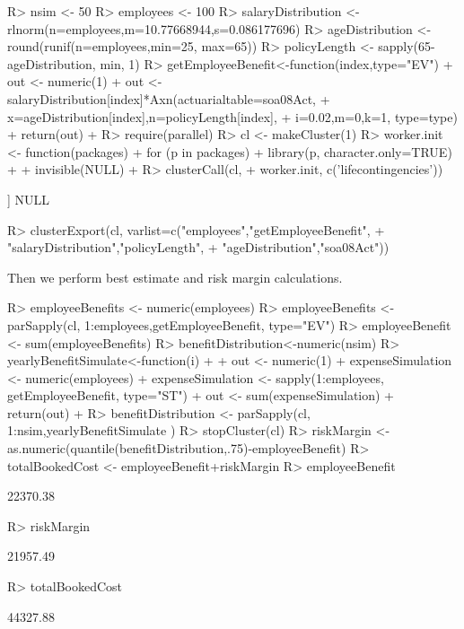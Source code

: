 \documentclass[nojss]{jss}
\begin{document}
\begin{Schunk}
\begin{Sinput}
R> nsim <- 50
R> employees <- 100
R> salaryDistribution <- rlnorm(n=employees,m=10.77668944,s=0.086177696)
R> ageDistribution <- round(runif(n=employees,min=25, max=65))
R> policyLength <- sapply(65-ageDistribution, min, 1)
R> getEmployeeBenefit<-function(index,type="EV") {
+  	out <- numeric(1)
+  	out <- salaryDistribution[index]*Axn(actuarialtable=soa08Act, 
+  			x=ageDistribution[index],n=policyLength[index], 
+  			i=0.02,m=0,k=1, type=type)
+  	return(out)
+  }
R> require(parallel)
R> cl <- makeCluster(1) 
R> worker.init <- function(packages) {
+  	for (p in packages) {
+  		library(p, character.only=TRUE)
+  	}
+  	invisible(NULL)
+  }
R> clusterCall(cl, 
+  		worker.init, c('lifecontingencies'))
\end{Sinput}
\begin{Soutput}
[[1]]
NULL
\end{Soutput}
\begin{Sinput}
R> clusterExport(cl, varlist=c("employees","getEmployeeBenefit",
+  				"salaryDistribution","policyLength",
+  				"ageDistribution","soa08Act"))
\end{Sinput}
\end{Schunk}
Then we perform best estimate and risk margin calculations.

\begin{Schunk}
\begin{Sinput}
R> employeeBenefits <- numeric(employees)
R> employeeBenefits <- parSapply(cl, 1:employees,getEmployeeBenefit, type="EV")
R> employeeBenefit <- sum(employeeBenefits)
R> benefitDistribution<-numeric(nsim)
R> yearlyBenefitSimulate<-function(i)
+  {
+  	out <- numeric(1)
+  	expenseSimulation <- numeric(employees)
+  	expenseSimulation <- sapply(1:employees, getEmployeeBenefit, type="ST")
+  	out <- sum(expenseSimulation)
+  	return(out)
+  }
R> benefitDistribution <- parSapply(cl, 1:nsim,yearlyBenefitSimulate )
R> stopCluster(cl)
R> riskMargin <- as.numeric(quantile(benefitDistribution,.75)-employeeBenefit)
R> totalBookedCost <- employeeBenefit+riskMargin
R> employeeBenefit
\end{Sinput}
\begin{Soutput}
[1] 22370.38
\end{Soutput}
\begin{Sinput}
R> riskMargin
\end{Sinput}
\begin{Soutput}
[1] 21957.49
\end{Soutput}
\begin{Sinput}
R> totalBookedCost
\end{Sinput}
\begin{Soutput}
[1] 44327.88
\end{Soutput}
\end{Schunk}
\end{document}
